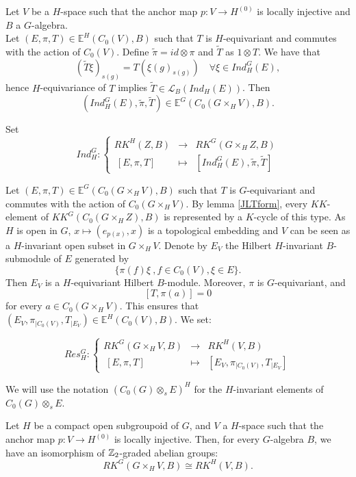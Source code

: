
Let $V$ be a $H$-space such that the anchor map $p : V\rightarrow H^{(0)}$ is locally injective and $B$ a $G$-algebra. \\

Let $(E,\pi,T)\in \mathbb E^H(C_0(V),B)$ such that $T$ is $H$-equivariant and commutes with the action of $C_0(V)$. Define $\tilde\pi = id\otimes \pi$ and $\tilde T$ as $1\otimes T$. We have that 
\[(\tilde T\xi)_{s(g)} = T(\xi(g)_{s(g)})\quad \forall \xi \in Ind_H^G(E),  \]
hence $H$-equivariance of $T$ implies $\tilde T\in\mathcal L_B(Ind_H (E))$. Then 
\[(Ind_H^G (E), \tilde \pi, \tilde T)\in \mathbb E^G(C_0(G\times_H V),B).\] %

Set
\[Ind_H^G :
\left\{\begin{array}{rcl} 
RK^H(Z,B) & \rightarrow & RK^G(G\times_H Z,B) \\
\ [E,\pi,T ] & \mapsto & [ Ind_H^G (E), \tilde \pi, \tilde T ] \end{array} \right.\]

Let $(E,\pi,T)\in \mathbb E^G(C_0(G\times_H V),B)$ such that $T$ is $G$-equivariant and commutes with the action of $C_0(G\times_H V)$. By lemma \ref{JLTform}, every $KK$-element of $KK^G(C_0(G\times_H Z),B)$ is represented by a $K$-cycle of this type.  As $H$ is open in $G$, $x\mapsto (e_{p(x)},x)$ is a topological embedding and $V$ can be seen as a $H$-invariant open subset in $G\times_H V$. Denote by $E_V$ the Hilbert $H$-invariant $B$-submodule of $E$ generated by 
\[\{\pi(f)\xi \ ,f\in C_0(V), \xi\in E\}.\]
Then $E_{V}$ is a $H$-equivariant Hilbert $B$-module. Moreover, $\pi$ is $G$-equivariant, and \[[T,\pi(a)]=0\] for every $a\in C_0(G\times_H V)$. This ensures that $(E_V,\pi_{|C_0(V)}, T_{|E_V}) \in \mathbb E^H(C_0(V),B)$. We set:

\[Res_H^G :
\left\{\begin{array}{rcl} 
 RK^G(G\times_H V,B) & \rightarrow & RK^H(V,B) \\
\ [E,\pi,T ] & \mapsto & [ E_V,\pi_{|C_0(V)}, T_{|E_V} ] \end{array} \right.\]

We will use the notation $\left( C_0(G)\otimes_s E \right)^H$ for the $H$-invariant elements of $C_0(G)\otimes_s E$.

\begin{lem} \label{Restriction} Let $H$ be a compact open subgroupoid of $G$, and $V$ a $H$-space such that the anchor map $p : V\rightarrow H^{(0)}$ is locally injective. Then, for every $G$-algebra $B$, we have an isomorphism of $\mathbb Z_2$-graded abelian groups:
\[RK^G( G\times_H V, B) \cong RK^H(V, B).\]
\end{lem}

